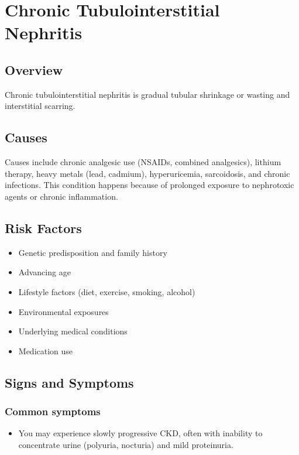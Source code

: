 \chapter{Chronic Tubulointerstitial Nephritis}
\label{sec:Chronic Tubulointerstitial Nephritis}

\section{Overview}
Chronic tubulointerstitial nephritis is gradual tubular shrinkage or wasting and interstitial scarring.
\section{Causes}
Causes include chronic analgesic use (NSAIDs, combined analgesics), lithium therapy, heavy metals (lead, cadmium), hyperuricemia, sarcoidosis, and chronic infections. This condition happens because of prolonged exposure to nephrotoxic agents or chronic inflammation.     
\section{Risk Factors}

\begin{itemize}[noitemsep]
  \item Genetic predisposition and family history
  \item Advancing age
  \item Lifestyle factors (diet, exercise, smoking, alcohol)
  \item Environmental exposures
  \item Underlying medical conditions
  \item Medication use
\end{itemize}
\section{Signs and Symptoms}

\subsection{Common symptoms}
\begin{itemize}[noitemsep]
  \item You may experience slowly progressive CKD, often with inability to concentrate urine (polyuria, nocturia) and mild proteinuria. 
  \end{itemize}

